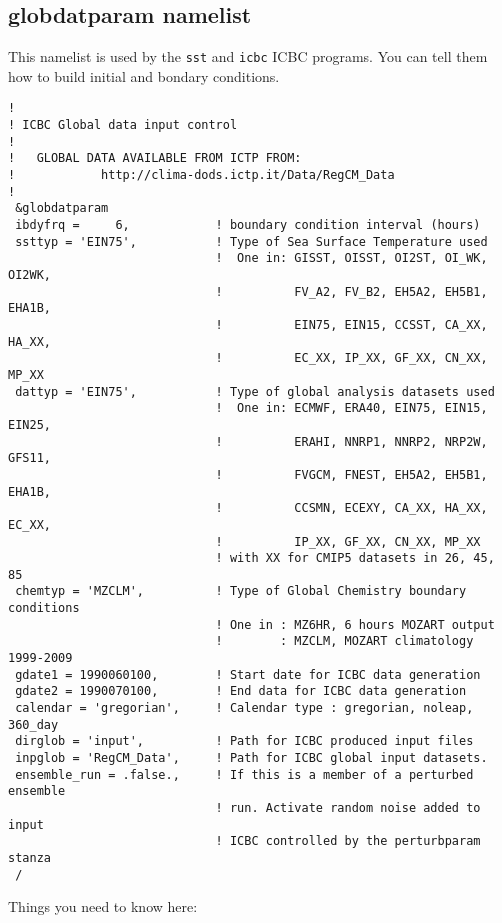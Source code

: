 \subsection{globdatparam namelist}
\label{globparam}

This namelist is used by the \verb=sst= and \verb=icbc= ICBC programs. You can
tell them how to build initial and bondary conditions.

{\footnotesize
\begin{Verbatim}
!
! ICBC Global data input control
!
!   GLOBAL DATA AVAILABLE FROM ICTP FROM:
!            http://clima-dods.ictp.it/Data/RegCM_Data
!
 &globdatparam
 ibdyfrq =     6,            ! boundary condition interval (hours)
 ssttyp = 'EIN75',           ! Type of Sea Surface Temperature used
                             !  One in: GISST, OISST, OI2ST, OI_WK, OI2WK,
                             !          FV_A2, FV_B2, EH5A2, EH5B1, EHA1B,
                             !          EIN75, EIN15, CCSST, CA_XX, HA_XX,
                             !          EC_XX, IP_XX, GF_XX, CN_XX, MP_XX
 dattyp = 'EIN75',           ! Type of global analysis datasets used
                             !  One in: ECMWF, ERA40, EIN75, EIN15, EIN25,
                             !          ERAHI, NNRP1, NNRP2, NRP2W, GFS11,
                             !          FVGCM, FNEST, EH5A2, EH5B1, EHA1B,
                             !          CCSMN, ECEXY, CA_XX, HA_XX, EC_XX,
                             !          IP_XX, GF_XX, CN_XX, MP_XX
                             ! with XX for CMIP5 datasets in 26, 45, 85
 chemtyp = 'MZCLM',          ! Type of Global Chemistry boundary conditions
                             ! One in : MZ6HR, 6 hours MOZART output
                             !        : MZCLM, MOZART climatology 1999-2009
 gdate1 = 1990060100,        ! Start date for ICBC data generation
 gdate2 = 1990070100,        ! End data for ICBC data generation
 calendar = 'gregorian',     ! Calendar type : gregorian, noleap, 360_day
 dirglob = 'input',          ! Path for ICBC produced input files
 inpglob = 'RegCM_Data',     ! Path for ICBC global input datasets.
 ensemble_run = .false.,     ! If this is a member of a perturbed ensemble
                             ! run. Activate random noise added to input
                             ! ICBC controlled by the perturbparam stanza
 /
\end{Verbatim}
}

Things you need to know here:

